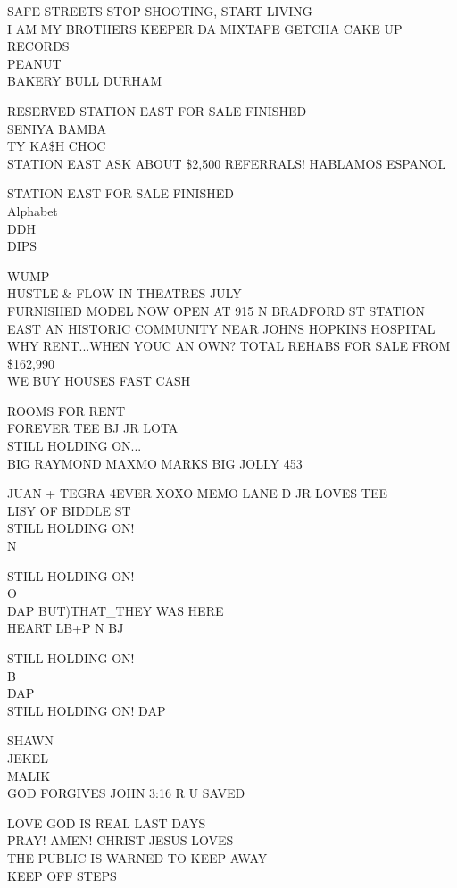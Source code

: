 \documentclass[10pt,letterpaper]{article}
\begin{document}
SAFE STREETS STOP SHOOTING, START LIVING\\
I AM MY BROTHERS KEEPER DA MIXTAPE GETCHA CAKE UP RECORDS\\
PEANUT\\
BAKERY BULL DURHAM

RESERVED STATION EAST FOR SALE FINISHED\\
SENIYA BAMBA\\
TY KA\$H CHOC\\
STATION EAST ASK ABOUT \$2,500 REFERRALS!  HABLAMOS ESPANOL

STATION EAST FOR SALE FINISHED\\
Alphabet\\
DDH\\
DIPS

WUMP\\
HUSTLE \& FLOW IN THEATRES JULY\\
FURNISHED MODEL NOW OPEN AT 915 N BRADFORD ST STATION EAST AN HISTORIC COMMUNITY NEAR JOHNS HOPKINS HOSPITAL WHY RENT...WHEN YOUC AN OWN?  TOTAL REHABS FOR SALE FROM \$162,990\\
WE BUY HOUSES FAST CASH

ROOMS FOR RENT\\
FOREVER TEE BJ JR LOTA\\
STILL HOLDING ON...\\
BIG RAYMOND MAXMO MARKS BIG JOLLY 453

JUAN + TEGRA 4EVER XOXO MEMO LANE D JR LOVES TEE\\
LISY OF BIDDLE ST\\
STILL HOLDING ON!\\
N

STILL HOLDING ON!\\
O\\
DAP BUT)THAT\_THEY WAS HERE\\
HEART LB+P N BJ

STILL HOLDING ON!\\
B\\
DAP\\
STILL HOLDING ON!  DAP

SHAWN\\
JEKEL\\
MALIK\\
GOD FORGIVES JOHN 3:16 R U SAVED

LOVE GOD IS REAL LAST DAYS\\
PRAY!  AMEN!  CHRIST JESUS LOVES\\
THE PUBLIC IS WARNED TO KEEP AWAY\\
KEEP OFF STEPS
\end{document}
